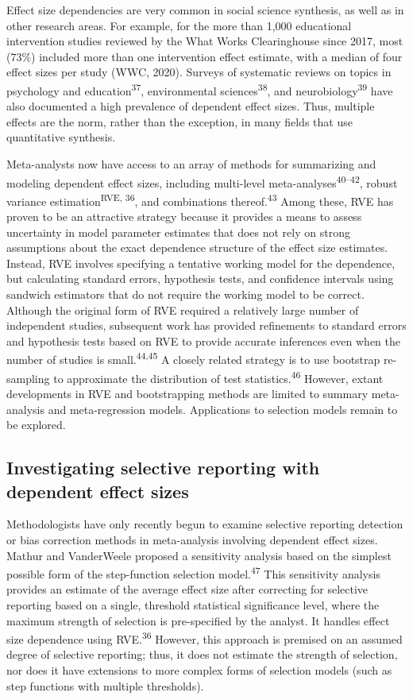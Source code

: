 \documentclass[
  american,
  man, donotrepeattitle,floatsintext]{apa7}
\begin{document}
Effect size dependencies are very common in social science synthesis, as well as in other research areas.
For example, for the more than 1,000 educational intervention studies reviewed by the What Works Clearinghouse since 2017, most (73\%) included more than one intervention effect estimate, with a median of four effect sizes per study (WWC, 2020).
Surveys of systematic reviews on topics in psychology and education\textsuperscript{37}, environmental sciences\textsuperscript{38}, and neurobiology\textsuperscript{39} have also documented a high prevalence of dependent effect sizes.
Thus, multiple effects are the norm, rather than the exception, in many fields that use quantitative synthesis.

Meta-analysts now have access to an array of methods for summarizing and modeling dependent effect sizes, including multi-level meta-analyses\textsuperscript{40--42}, robust variance estimation\textsuperscript{RVE, 36}, and combinations thereof.\textsuperscript{43}
Among these, RVE has proven to be an attractive strategy because it provides a means to assess uncertainty in model parameter estimates that does not rely on strong assumptions about the exact dependence structure of the effect size estimates.
Instead, RVE involves specifying a tentative working model for the dependence, but calculating standard errors, hypothesis tests, and confidence intervals using sandwich estimators that do not require the working model to be correct.
Although the original form of RVE required a relatively large number of independent studies, subsequent work has provided refinements to standard errors and hypothesis tests based on RVE to provide accurate inferences even when the number of studies is small.\textsuperscript{44,45}
A closely related strategy is to use bootstrap re-sampling to approximate the distribution of test statistics.\textsuperscript{46}
However, extant developments in RVE and bootstrapping methods are limited to summary meta-analysis and meta-regression models.
Applications to selection models remain to be explored.

\subsection{Investigating selective reporting with dependent effect sizes}\label{investigating-selective-reporting-with-dependent-effect-sizes}

Methodologists have only recently begun to examine selective reporting detection or bias correction methods in meta-analysis involving dependent effect sizes.
Mathur and VanderWeele proposed a sensitivity analysis based on the simplest possible form of the step-function selection model.\textsuperscript{47}
This sensitivity analysis provides an estimate of the average effect size after correcting for selective reporting based on a single, threshold statistical significance level, where the maximum strength of selection is pre-specified by the analyst.
It handles effect size dependence using RVE.\textsuperscript{36}
However, this approach is premised on an assumed degree of selective reporting; thus, it does not estimate the strength of selection, nor does it have extensions to more complex forms of selection models (such as step functions with multiple thresholds).
\end{document}
